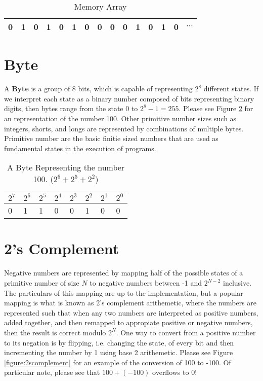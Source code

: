 \documentclass[12pt, letterpaper]{book}
\begin{document}
\begin{table}[h]
\centering
\begin{tabular}{|l|l|l|l|l|l|l|l|l|l|l|l|l|l|l|}
\hline
0 & 1 & 0 & 1 & 0 & 1 & 0 & 0 & 0 & 0 & 1 & 0 & 1 & 0 & $\cdots$\\ \hline
\end{tabular}
\caption{Memory Array}
\label{figure:memory}
\end{table}

\section{Byte}
	A \textbf{Byte} is a group of 8 bits, which is capable of representing $2^{8}$ different states. If we interpret each state as a binary number composed of bits representing binary digits, then bytes range from the state 0 to $2^{8} - 1 = 255$. Please see Figure \ref{figure:byte100} for an representation of the number 100. Other primitive number sizes such as integers, shorts, and longs are represented by combinations of multiple bytes. Primitive number are the basic finitie sized numbers that are used as fundamental states in the execution of programs. 

\begin{table}[h]
\centering
\begin{tabular}{llllllll}
$2^{7}$ & $2^{6}$ & $2^{5}$ & $2^{4}$    & $2^{3}$   & $2^{2}$  & $2^{1}$ & $2^{0}$ \\ \hline
\multicolumn{1}{|l|}{0} & \multicolumn{1}{l|}{1} & \multicolumn{1}{l|}{1} & \multicolumn{1}{l|}{0} & \multicolumn{1}{l|}{0} & \multicolumn{1}{l|}{1} & \multicolumn{1}{l|}{0} & \multicolumn{1}{l|}{0} \\ \hline
\end{tabular}
\caption{A Byte Representing the number 100. ($2^{6} + 2^{5} + 2^{2}$)}
\label{figure:byte100}
\end{table}

\section{2's Complement}
Negative numbers are represented by mapping half of the possible states of a primitive number of size $N$ to negative numbers between -1 and $2^{N-2}$ inclusive. The particulars of this mapping are up to the implementation, but a popular mapping is what is known as 2's complement arithemetic, where the numbers are represented such that when any two numbers are interpreted as positive numbers, added together, and then remapped to appropiate positive or negative numbers, then the result is correct modulo $2^{N}$. One way to convert from a positive number to its negation is by flipping, i.e. changing the state, of every bit and then incrementing the number by 1 using base 2 arithemetic. Please see Figure \ref{figure:2scomplement} for an example of the conversion of 100 to -100. Of particular note, please see that $100 + (-100)$ overflows to 0!
\end{document}
